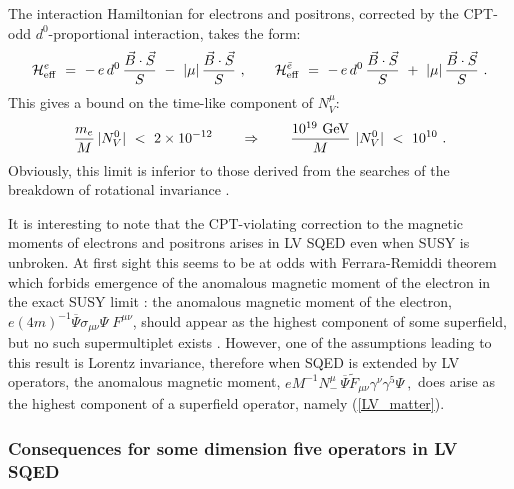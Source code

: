 \documentclass[12pt]{revtex4}
\begin{document}
The interaction Hamiltonian for electrons and positrons, corrected by the 
CPT-odd $d^0$-proportional interaction, takes the form: 
\begin{equation}
 \mathcal{H}_{\rm eff}^{e} ~=~ 
-\, e\, d^0\, \frac{\vec{B}\cdot\vec{S}}{S}
~-~ 
|\mu|\, \frac{\vec{B}\cdot\vec{S}}{S}~, 
\qquad 
 \mathcal{H}_{\rm eff}^{\bar{e}} ~=~  
-\, e\, d^0\, \frac{\vec{B}\cdot\vec{S}}{S}
~+~ 
|\mu|\, \frac{\vec{B}\cdot\vec{S}}{S}~.
\end{equation}
%
This gives a bound on the time-like component of $N_V^\mu$: 
\begin{equation}
 \frac{m_e}{M}\,  |N_V^0| ~<~ 2\times 10^{-12} 
\qquad \Rightarrow \qquad 
\frac {10^{19}~{\rm GeV}}{M} ~ |N_V^0| ~<~ 10^{10} 
~.
\end{equation}
%
Obviously, this limit is inferior to those derived from the searches of
the breakdown of rotational invariance \cite{clock1,clock2}.


It is interesting to note that the CPT-violating correction to
the magnetic moments of electrons and positrons arises in LV SQED 
even when SUSY is unbroken. At first sight this seems to 
be at odds with Ferrara-Remiddi theorem which
forbids emergence of the anomalous magnetic moment of the
electron in the exact SUSY limit \cite{Ferrara:1974wb}: 
the anomalous magnetic moment of the electron, 
$e(4m)^{-1} \overline{\Psi} \sigma_{\mu\nu} \Psi \; F^{\mu\nu}$,
should appear as the highest component of some superfield, but
no such supermultiplet exists \cite{Ferrara:1974wb}. However, one of
the assumptions leading to this result is Lorentz invariance, therefore 
when SQED is extended by LV operators, the anomalous magnetic 
moment, 
\( 
eM^{-1}N_-^\mu \, \overline{\Psi} \widetilde{F}_{\mu\nu}
\gamma^\nu \gamma^5 \Psi~, 
\) 
does arise as the highest component of a superfield  operator, namely 
(\ref{LV_matter}). 


\subsubsection*{Consequences for some dimension five operators in LV
SQED} 
\end{document}
